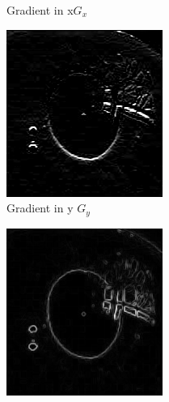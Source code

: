 \begin{figure}[ht]
\begin{subfigure}{.33\textwidth}
        \caption{Gradient in x\textbf{$G_{x}$}}
        \label{fig:sx}
      \end{subfigure}%
      \begin{subfigure}{.33\textwidth}
        \centering
        \includegraphics[width=.9\linewidth]{plots/eye_dataset/sy.png}
        \caption{Gradient in y \textbf{$G_{y}$}}
        \label{fig:sy}
      \end{subfigure}
      \begin{subfigure}{.33\textwidth}
        \centering
        \includegraphics[width=.9\linewidth]{plots/eye_dataset/mag.png}

\end{subfigure}
\end{figure}
